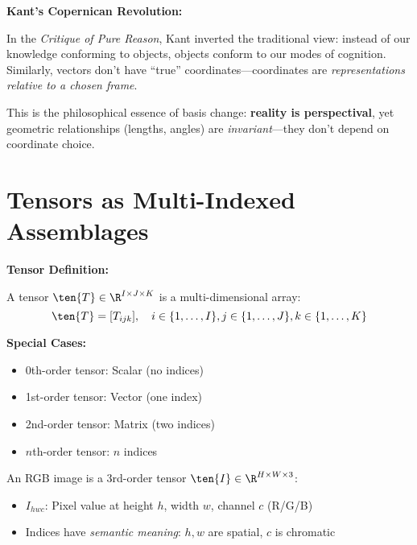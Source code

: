 \begin{philobox}
	\textbf{Kant's Copernican Revolution:}
	
	In the \textit{Critique of Pure Reason}, Kant inverted the traditional view: instead of our knowledge conforming to objects, objects conform to our modes of cognition. Similarly, vectors don't have ``true'' coordinates---coordinates are \textit{representations relative to a chosen frame}.
	
	This is the philosophical essence of basis change: \textbf{reality is perspectival}, yet geometric relationships (lengths, angles) are \textit{invariant}---they don't depend on coordinate choice.
\end{philobox}

\section{Tensors as Multi-Indexed Assemblages}

\begin{seanbox}{1.5}
	\textbf{Tensor Definition:}
	
	A tensor $\ten{T} \in \R^{I \times J \times K}$ is a multi-dimensional array:
	\begin{equation}
		\ten{T} = [T_{ijk}], \quad i \in \{1,\ldots,I\}, j \in \{1,\ldots,J\}, k \in \{1,\ldots,K\}
	\end{equation}
	
	\textbf{Special Cases:}
	\begin{itemize}
		\item 0th-order tensor: Scalar (no indices)
		\item 1st-order tensor: Vector (one index)
		\item 2nd-order tensor: Matrix (two indices)
		\item $n$th-order tensor: $n$ indices
	\end{itemize}
\end{seanbox}

\begin{example}
	An RGB image is a 3rd-order tensor $\ten{I} \in \R^{H \times W \times 3}$:
	\begin{itemize}
		\item $I_{hwc}$: Pixel value at height $h$, width $w$, channel $c$ (R/G/B)
		\item Indices have \textit{semantic meaning}: $h,w$ are spatial, $c$ is chromatic
	\end{itemize}
\end{example}

